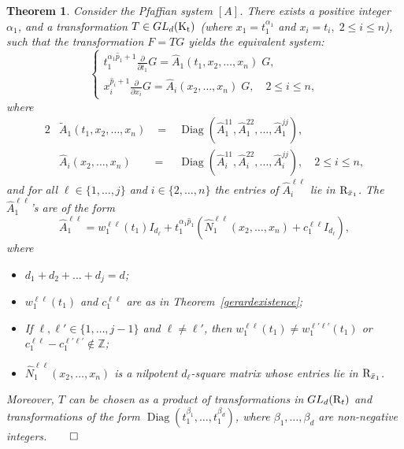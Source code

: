 \documentclass[final,1p,times,number,amsthm]{elsart}
\newtheorem{theorem}[lemma]{Theorem}
\newcommand{\pder}[2]{\frac{\partial}{\partial #2}#1}
\begin{document}
\begin{theorem}
\label{gerardtransformation}
Consider the Pfaffian system $[A]$. There exists a positive integer $\alpha_1$,
and a transformation $T \in GL_d({\rm K_t})$ (where $x_1 = t_1^{\alpha_1}$ and
$x_i = t_i, \; 2 \leq i \leq n$), such that the transformation $F= T G$ yields
the equivalent system:
\begin{equation}
  \label{eq:ger}
  \begin{cases}
    t_1^{\alpha_1 \hat{p}_1 + 1} \pder{G}{t_1} = \hat{A}_{1}(t_1, x_2, \dots, x_n)
\; G, \\[7pt] x_i^{ \hat{p}_i+1} \pder{G}{x_i}= \hat{A}_{i}(x_2, \dots, x_n)\; G,
\quad 2 \leq i \leq n,
\end{cases}
\end{equation}
where
\begin{alignat*}2 & {\tilde{A}}_{1}(t_1, x_2, \dots, x_n) &\; =\;
  &\operatorname{Diag} (\hat{A}^{11}_{1}, \hat{A}^{22}_{1},
  \dots, \hat{A}^{jj}_{1}), \\
  &\hat{A}_{i}(x_2, \dots, x_n)& =\; & \operatorname{Diag}
  (\hat{A}^{11}_{i}, \hat{A}^{22}_{i}, \dots, \hat{A}^{jj}_{i}), \quad 2
  \leq i \leq n,
\end{alignat*}
and for all $\ell \in \{1, \dots, j\}$ and $i \in \{2, \dots, n\}$ the entries
of $\hat{A}^{{\ell} {\ell} }_{{i}}$ lie in ${\rm R}_{\bar{x}_{1}}$. The
$\hat{A}_1^{\ell\ell}$'s are of the form
 \[\hat{A}^{{\ell} {\ell} }_{1} = w^{{\ell} {\ell} }_{1} (t_1) I_{d_{\ell}
   } + t_1^{\alpha_1 \hat{p}_1}(\hat{N}^{{\ell} {\ell} }_{1}(x_2, \dots, x_n) +
   c^{{\ell} {\ell} }_{1} I_{d_{\ell}}),\] where

\begin{itemize}
\item $d_1 + d_2 + \dots + d_j = d$;
\item $w^{{\ell} {\ell} }_{1} (t_1)$ and $c^{{\ell} {\ell} }_{1}$ are as in
  Theorem~\ref{gerardexistence};
\item If $\ell, \ell' \in \{ 1, \dots, j-1 \}$ and $\ell \neq \ell'$, then
  $ w^{ \ell \ell}_{1} (t_1) \neq w^{ \ell' \ell'}_{1} (t_1)$ or
  $c^{ \ell \ell}_{1} - c^{ \ell' \ell'}_{1} \not \in
  \mathbb{Z}$;
\item $\hat{N}^{{\ell} {\ell} }_{1} (x_2, \dots, x_n)$ is a nilpotent
  $d_{\ell} $-square matrix whose entries lie in ${\rm R}_{\bar{x}_{1}}$.
\end{itemize}

\noindent Moreover, $T$ can be chosen as a product of transformations in
$GL_d({\rm R}_t)$ and transformations of the form
$\operatorname{Diag} (t_1^{\beta_1}, \dots, t_1^{\beta_d})$, where
$\beta_1, \dots, \beta_d$ are non-negative integers.$\hfill\qed$
\end{theorem}
\end{document}
